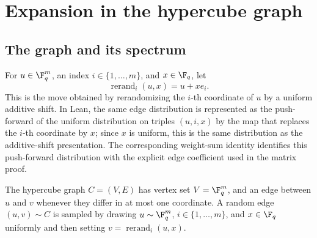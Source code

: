 \chapter{Expansion in the hypercube graph}
\label{chap:expansion}
\label{sec:expansion}

\section{The graph and its spectrum}


\begin{definition}\label{def:rerandomize-coord}
	\leanok
	For $u \in \F_q^m$, an index $i \in \{1,\dots,m\}$, and $x \in \F_q$, let
	\[
		\operatorname{rerand}_i(u,x) = u + x e_i.
	\]
	This is the move obtained by rerandomizing the $i$-th coordinate of $u$ by a uniform additive shift.
	In Lean, the same edge distribution is represented as the push-forward of the uniform distribution
	on triples $(u,i,x)$ by the map that replaces the $i$-th coordinate by $x$; since $x$ is uniform,
	this is the same distribution as the additive-shift presentation.  The corresponding
	weight-sum identity identifies this push-forward distribution with the explicit edge
	coefficient used in the matrix proof.
\end{definition}

\begin{definition}\label{def:hypercube-graph}
	\leanok
	The hypercube graph $C=(V,E)$ has vertex set $V=\F_q^m$, and an edge between $u$ and $v$ whenever they differ in at most one coordinate. A random edge $(u,v) \sim C$ is sampled by drawing $u \sim \F_q^m$, $i \in \{1,\dots,m\}$, and $x \in \F_q$ uniformly and then setting $v=\operatorname{rerand}_i(u,x)$.
\end{definition}

